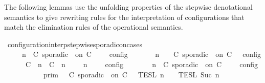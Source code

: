 \begin{isabellebody}
%
\endisatagproof
{\isafoldproof}%
%
\isadelimproof
%
\endisadelimproof
%
\begin{isamarkuptext}%
The following lemmas use the unfolding properties of the stepwise denotational 
  semantics to give rewriting rules for the interpretation of configurations that
  match the elimination rules of the operational semantics.%
\end{isamarkuptext}\isamarkuptrue%
\isamarkupfalse%
\ configuration{\isacharunderscore}interp{\isacharunderscore}stepwise{\isacharunderscore}sporadicon{\isacharunderscore}cases{\isacharcolon}\isanewline
\ \ \ {\isacartoucheopen}{\isasymlbrakk}\ {\isasymGamma}{\isacharcomma}\ n\ {\isasymTurnstile}\ {\isacharparenleft}{\isacharparenleft}C\ sporadic\ {\isasymtau}\ on\ C\ {\isacharhash}\ {\isasymPsi}{\isacharparenright}\ {\isasymtriangleright}\ {\isasymPhi}\ {\isasymrbrakk}\isactrlsub c\isactrlsub o\isactrlsub n\isactrlsub f\isactrlsub i\isactrlsub g\isanewline
\ \ \ \ {\isacharequal}\ {\isasymlbrakk}\ {\isasymGamma}{\isacharcomma}\ n\ {\isasymTurnstile}\ {\isasymPsi}\ {\isasymtriangleright}\ {\isacharparenleft}{\isacharparenleft}C\ sporadic\ {\isasymtau}\ on\ C\ {\isacharhash}\ {\isasymPhi}{\isacharparenright}\ {\isasymrbrakk}\isactrlsub c\isactrlsub o\isactrlsub n\isactrlsub f\isactrlsub i\isactrlsub g\isanewline
\ \ \ \ {\isasymunion}\ {\isasymlbrakk}\ {\isacharparenleft}{\isacharparenleft}C\ {\isasymUp}\ n{\isacharparenright}\ {\isacharhash}\ {\isacharparenleft}C\ {\isasymDown}\ n\ {\isacharat}\ {\isasymtau}{\isacharparenright}\ {\isacharhash}\ {\isasymGamma}{\isacharparenright}{\isacharcomma}\ n\ {\isasymTurnstile}\ {\isasymPsi}\ {\isasymtriangleright}\ {\isasymPhi}\ {\isasymrbrakk}\isactrlsub c\isactrlsub o\isactrlsub n\isactrlsub f\isactrlsub i\isactrlsub g{\isacartoucheclose}\isanewline
%
\isadelimproof
%
\endisadelimproof
%
\isatagproof
{}\isamarkupfalse%
\ {\isacharminus}\isanewline
\ \ \isamarkupfalse%
\ {\isacartoucheopen}{\isasymlbrakk}\ {\isasymGamma}{\isacharcomma}\ n\ {\isasymTurnstile}\ {\isacharparenleft}C\ sporadic\ {\isasymtau}\ on\ C\ {\isacharhash}\ {\isasymPsi}\ {\isasymtriangleright}\ {\isasymPhi}\ {\isasymrbrakk}\isactrlsub c\isactrlsub o\isactrlsub n\isactrlsub f\isactrlsub i\isactrlsub g\isanewline
\ \ \ \ \ \ \ \ {\isacharequal}\ {\isasymlbrakk}{\isasymlbrakk}\ {\isasymGamma}\ {\isasymrbrakk}{\isasymrbrakk}\isactrlsub p\isactrlsub r\isactrlsub i\isactrlsub m\ {\isasyminter}\ {\isasymlbrakk}{\isasymlbrakk}\ {\isacharparenleft}C\ sporadic\ {\isasymtau}\ on\ C\ {\isacharhash}\ {\isasymPsi}\ {\isasymrbrakk}{\isasymrbrakk}\isactrlsub T\isactrlsub E\isactrlsub S\isactrlsub L\isactrlbsup {\isasymge}\ n\isactrlesup \ {\isasyminter}\ {\isasymlbrakk}{\isasymlbrakk}\ {\isasymPhi}\ {\isasymrbrakk}{\isasymrbrakk}\isactrlsub T\isactrlsub E\isactrlsub S\isactrlsub L\isactrlbsup {\isasymge}\ Suc\ n\isactrlesup {\isacartoucheclose}\isanewline

\end{isabellebody}
